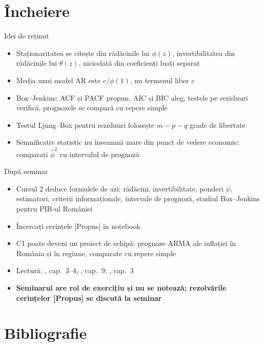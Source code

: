 \section{Încheiere}

\begin{frame}{Idei de reținut}
\itemsize{\small}
\begin{itemize}
    \item Staționaritatea se citește din rădăcinile lui $\phi(z)$, invertibilitatea din rădăcinile lui $\theta(z)$, niciodată din coeficienți luați separat
    \item Media unui model AR este $c/\phi(1)$, nu termenul liber $c$
    \item Box--Jenkins: ACF și PACF propun, AIC și BIC aleg, testele pe reziduuri verifică, prognozele se compară cu repere simple
    \item Testul Ljung--Box pentru reziduuri folosește $m - p - q$ grade de libertate
    \item Semnificativ statistic nu înseamnă mare din punct de vedere economic: comparați $\hat\phi^2$ cu intervalul de prognoză
\end{itemize}
\end{frame}

\begin{frame}{După seminar}
\itemsize{\small}
\begin{itemize}
    \item Cursul 2 deduce formulele de azi: rădăcini, invertibilitate, ponderi $\psi$, estimatori, criterii informaționale, intervale de prognoză, studiul Box--Jenkins pentru PIB-ul României
    \item Încercați cerințele [Propus] în notebook
    \item C1 poate deveni un proiect de echipă: prognoze ARMA ale inflației în România și în regiune, comparate cu repere simple
    \item Lectură: , cap.~3--4; , cap.~9; , cap.~3
    \item \textbf{Seminarul are rol de exercițiu și nu se notează; rezolvările cerințelor [Propus] se discută la seminar}
\end{itemize}
\end{frame}


\section{Bibliografie}


